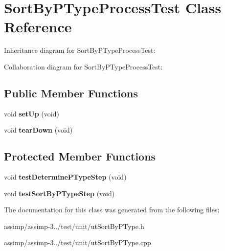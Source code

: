 \hypertarget{class_sort_by_p_type_process_test}{\section{Sort\+By\+P\+Type\+Process\+Test Class Reference}
\label{class_sort_by_p_type_process_test}
}


Inheritance diagram for Sort\+By\+P\+Type\+Process\+Test\+:


Collaboration diagram for Sort\+By\+P\+Type\+Process\+Test\+:
\subsection*{Public Member Functions}
\begin{DoxyCompactItemize}
\item 
\hypertarget{class_sort_by_p_type_process_test_aa0c630186fe2ad4d9e99f483fc558d77}{void {\bfseries set\+Up} (void)}\label{class_sort_by_p_type_process_test_aa0c630186fe2ad4d9e99f483fc558d77}

\item 
\hypertarget{class_sort_by_p_type_process_test_a55f34728505a43f462e24b303a7994ee}{void {\bfseries tear\+Down} (void)}\label{class_sort_by_p_type_process_test_a55f34728505a43f462e24b303a7994ee}

\end{DoxyCompactItemize}
\subsection*{Protected Member Functions}
\begin{DoxyCompactItemize}
\item 
\hypertarget{class_sort_by_p_type_process_test_a863dfcc5c7b18f8ea96b80ae6f3f77e0}{void {\bfseries test\+Determine\+P\+Type\+Step} (void)}\label{class_sort_by_p_type_process_test_a863dfcc5c7b18f8ea96b80ae6f3f77e0}

\item 
\hypertarget{class_sort_by_p_type_process_test_a235d462bcf202e18ef52f09662a3f59a}{void {\bfseries test\+Sort\+By\+P\+Type\+Step} (void)}\label{class_sort_by_p_type_process_test_a235d462bcf202e18ef52f09662a3f59a}

\end{DoxyCompactItemize}


The documentation for this class was generated from the following files\+:\begin{DoxyCompactItemize}
\item 
assimp/assimp-\/3../test/unit/ut\+Sort\+By\+P\+Type.\+h\item 
assimp/assimp-\/3../test/unit/ut\+Sort\+By\+P\+Type.\+cpp\end{DoxyCompactItemize}

